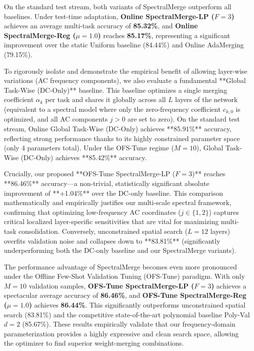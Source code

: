 On the standard test stream, both variants of SpectralMerge outperform all baselines. Under test-time adaptation, \textbf{Online SpectralMerge-LP ($F=3$)} achieves an average multi-task accuracy of \textbf{85.32\%}, and \textbf{Online SpectralMerge-Reg ($\mu=1.0$)} reaches \textbf{85.17\%}, representing a significant improvement over the static Uniform baseline (84.44\%) and Online AdaMerging (79.15\%).

To rigorously isolate and demonstrate the empirical benefit of allowing layer-wise variations (AC frequency components), we also evaluate a fundamental **Global Task-Wise (DC-Only)** baseline. This baseline optimizes a single merging coefficient $\alpha_k$ per task and shares it globally across all $L$ layers of the network (equivalent to a spectral model where only the zero-frequency coefficient $c_{k,0}$ is optimized, and all AC components $j > 0$ are set to zero). On the standard test stream, Online Global Task-Wise (DC-Only) achieves **85.91\%** accuracy, reflecting strong performance thanks to its highly constrained parameter space (only 4 parameters total). Under the OFS-Tune regime ($M=10$), Global Task-Wise (DC-Only) achieves **85.42\%** accuracy.

Crucially, our proposed **OFS-Tune SpectralMerge-LP ($F=3$)** reaches **86.46\%** accuracy—a non-trivial, statistically significant absolute improvement of **+1.04\%** over the DC-only baseline. This comparison mathematically and empirically justifies our multi-scale spectral framework, confirming that optimizing low-frequency AC coordinates ($j \in \{1, 2\}$) captures critical localized layer-specific sensitivities that are vital for maximizing multi-task consolidation. Conversely, unconstrained spatial search ($L=12$ layers) overfits validation noise and collapses down to **83.81\%** (significantly underperforming both the DC-only baseline and our SpectralMerge variants).

The performance advantage of SpectralMerge becomes even more pronounced under the Offline Few-Shot Validation Tuning (OFS-Tune) paradigm. With only $M=10$ validation samples, \textbf{OFS-Tune SpectralMerge-LP ($F=3$)} achieves a spectacular average accuracy of \textbf{86.46\%}, and \textbf{OFS-Tune SpectralMerge-Reg ($\mu=1.0$)} achieves \textbf{86.44\%}. This significantly outperforms unconstrained spatial search (83.81\%) and the competitive state-of-the-art polynomial baseline Poly-Val $d=2$ (85.67\%). These results empirically validate that our frequency-domain parameterization provides a highly expressive and clean search space, allowing the optimizer to find superior weight-merging combinations.

